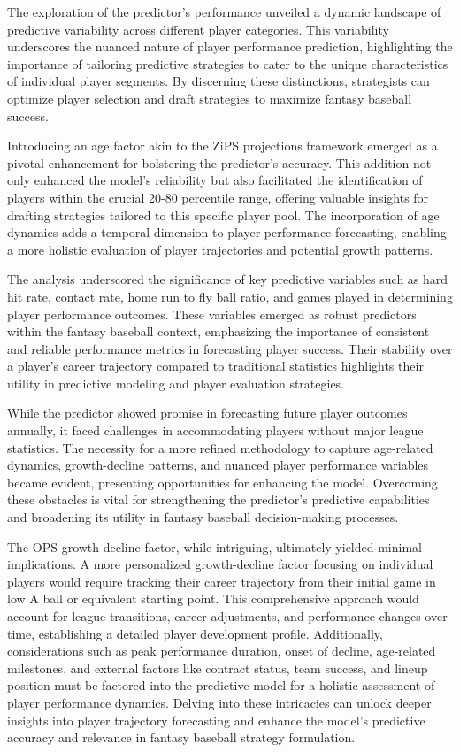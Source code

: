 \documentclass[12pt, english]{article}
\begin{document}
The exploration of the predictor's performance unveiled a dynamic landscape of predictive variability across different player categories. This variability underscores the nuanced nature of player performance prediction, highlighting the importance of tailoring predictive strategies to cater to the unique characteristics of individual player segments. By discerning these distinctions, strategists can optimize player selection and draft strategies to maximize fantasy baseball success.


Introducing an age factor akin to the ZiPS projections framework emerged as a pivotal enhancement for bolstering the predictor's accuracy. This addition not only enhanced the model's reliability but also facilitated the identification of players within the crucial 20-80 percentile range, offering valuable insights for drafting strategies tailored to this specific player pool. The incorporation of age dynamics adds a temporal dimension to player performance forecasting, enabling a more holistic evaluation of player trajectories and potential growth patterns.


The analysis underscored the significance of key predictive variables such as hard hit rate, contact rate, home run to fly ball ratio, and games played in determining player performance outcomes. These variables emerged as robust predictors within the fantasy baseball context, emphasizing the importance of consistent and reliable performance metrics in forecasting player success. Their stability over a player's career trajectory compared to traditional statistics highlights their utility in predictive modeling and player evaluation strategies.


While the predictor showed promise in forecasting future player outcomes annually, it faced challenges in accommodating players without major league statistics. The necessity for a more refined methodology to capture age-related dynamics, growth-decline patterns, and nuanced player performance variables became evident, presenting opportunities for enhancing the model. Overcoming these obstacles is vital for strengthening the predictor's predictive capabilities and broadening its utility in fantasy baseball decision-making processes.


The OPS growth-decline factor, while intriguing, ultimately yielded minimal implications. A more personalized growth-decline factor focusing on individual players would require tracking their career trajectory from their initial game in low A ball or equivalent starting point. This comprehensive approach would account for league transitions, career adjustments, and performance changes over time, establishing a detailed player development profile. Additionally, considerations such as peak performance duration, onset of decline, age-related milestones, and external factors like contract status, team success, and lineup position must be factored into the predictive model for a holistic assessment of player performance dynamics. Delving into these intricacies can unlock deeper insights into player trajectory forecasting and enhance the model's predictive accuracy and relevance in fantasy baseball strategy formulation.
\end{document}
